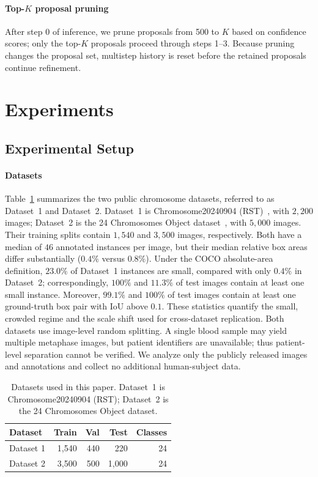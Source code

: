 \documentclass[journal,10pt]{IEEEtran}
\theoremstyle{definition}
\begin{document}
\paragraph{Top-$K$ proposal pruning}\label{sec:method-topk}
After step 0 of inference, we prune proposals from 500 to $K$ based on
confidence scores; only the top-$K$ proposals proceed through steps 1--3.
Because pruning changes the proposal set, multistep history is reset before
the retained proposals continue refinement.

\section{Experiments}\label{sec:exp}

\subsection{Experimental Setup}\label{sec:exp-setup}

\paragraph{Datasets}
Table~\ref{tab:datasets} summarizes the two public chromosome datasets,
referred to as Dataset~1 and Dataset~2. Dataset~1 is Chromosome20240904
(RST)~\cite{rst_dataset}, with $2{,}200$ images; Dataset~2 is the
24 Chromosomes Object dataset~\cite{tseng2023dataset,lu2022cil54816}, with
$5{,}000$ images. Their training splits contain $1{,}540$ and $3{,}500$
images, respectively. Both have a median of $46$ annotated instances per
image, but their median relative box areas differ substantially
($0.4\%$ versus $0.8\%$). Under the COCO absolute-area definition,
$23.0\%$ of Dataset~1 instances are small, compared with only $0.4\%$
in Dataset~2; correspondingly, $100\%$ and $11.3\%$ of test images
contain at least one small instance. Moreover, $99.1\%$ and $100\%$ of test images
contain at least one ground-truth box pair with IoU above $0.1$. These
statistics quantify the small, crowded regime and the scale shift used for
cross-dataset replication. Both datasets use image-level random splitting.
A single blood sample may yield multiple metaphase images, but patient
identifiers are unavailable; thus patient-level separation cannot be verified.
We analyze only the publicly released images and annotations and collect no
additional human-subject data.

\begin{table}[t]
  \centering
  \footnotesize
  \caption{Datasets used in this paper. Dataset~1 is Chromosome20240904 (RST);
  Dataset~2 is the 24 Chromosomes Object dataset.}
  \label{tab:datasets}
  \begin{tabular}{lrrrr}
    \toprule
    Dataset & Train & Val & Test & Classes \\
    \midrule
    Dataset 1 & 1,540 & 440 & 220  & 24 \\
    Dataset 2 & 3,500 & 500 & 1,000 & 24 \\
    \bottomrule
  \end{tabular}
\end{table}
\end{document}
